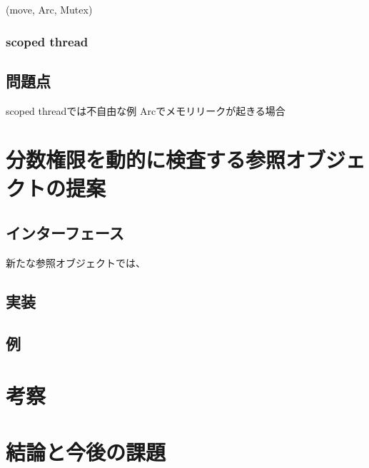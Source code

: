 \documentclass{sumiilab-paper}
\theoremstyle{mystyle}
\numberwithin{definition}{chapter} %
\newcommand{\bkeyword}[1]{\ensuremath{\mathbf{#1}}}
\newcommand{\TRUE}{\bkeyword{true}}
\newcommand{\FALSE}{\bkeyword{false}}
\newcommand{\IF}{\bkeyword{if}}
\newcommand{\THEN}{\bkeyword{then}}
\newcommand{\ELSE}{\bkeyword{else}}
\begin{document}
(move, Arc, Mutex)

\subsection{scoped thread}

\section{問題点}

scoped threadでは不自由な例
Arcでメモリリークが起きる場合

\chapter{分数権限を動的に検査する参照オブジェクトの提案}

\section{インターフェース}
新たな参照オブジェクトでは、

\section{実装}

\section{例}

\chapter{考察}

\chapter{結論と今後の課題}
\end{document}
